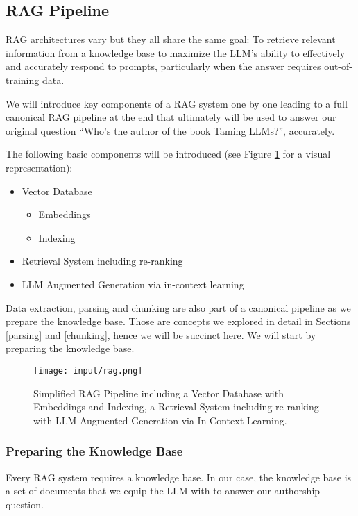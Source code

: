 \subsection{RAG Pipeline}

RAG architectures vary but they all share the same goal: To retrieve relevant information from a knowledge base to maximize the LLM's ability to effectively and accurately respond to prompts, particularly when the answer requires out-of-training data.

We will introduce key components of a RAG system one by one leading to a full canonical RAG pipeline at the end that ultimately will be used to answer our original question ``Who's the author of the book Taming LLMs?'', accurately.

The following basic components will be introduced (see Figure \ref{fig:rag_pipeline} for a visual representation):
\begin{itemize}
    \item Vector Database
    \begin{itemize}
        \item Embeddings
        \item Indexing
    \end{itemize}
    \item Retrieval System including re-ranking
    \item LLM Augmented Generation via in-context learning
\end{itemize}

Data extraction, parsing and chunking are also part of a canonical pipeline as we prepare the knowledge base. Those are concepts we explored in detail in Sections \ref{parsing} and \ref{chunking}, hence we will be succinct here. We will start by preparing the knowledge base.

\begin{figure}[H]
\centering
\texttt{[image: input/rag.png]}
\caption{Simplified RAG Pipeline including a Vector Database with Embeddings and Indexing, a Retrieval System including re-ranking with LLM Augmented Generation via In-Context Learning.}
\label{fig:rag_pipeline}
\end{figure}

\subsubsection{Preparing the Knowledge Base}

Every RAG system requires a knowledge base. In our case, the knowledge base is a set of documents that we equip the LLM with to answer our authorship question.

